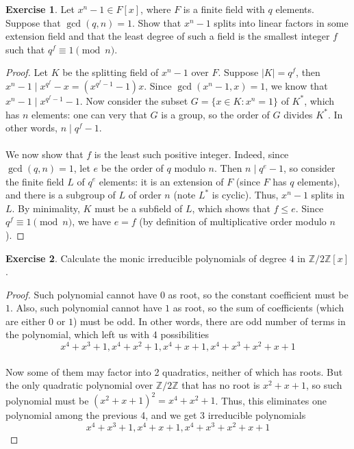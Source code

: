 \documentclass{article}
\theoremstyle{definition}
\newtheorem{exercise}{Exercise}
\begin{document}
\newpage

\begin{exercise}
Let $x^n - 1 \in F[x]$, where $F$ is a finite field with $q$ elements. Suppose that $\gcd(q, n) = 1$. Show that $x^n - 1$ splits into linear factors in some extension field and that the least degree of such a field is the smallest integer $f$ such that $q^f \equiv 1 \pmod{n}$.
\end{exercise}
\begin{proof}
Let $K$ be the splitting field of $x^n - 1$ over $F$. Suppose $|K| = q^f$, then $x^n - 1 \mid x^{q^f} - x = (x^{q^f - 1} - 1) x$. Since $\gcd(x^n - 1, x) = 1$, we know that $x^n - 1 \mid x^{q^f - 1} - 1$. Now consider the subset $G = \{ x \in K : x^n = 1 \}$ of $K^*$, which has $n$ elements: one can very that $G$ is a group, so the order of $G$ divides $K^*$. In other words, $n \mid q^f - 1$.
\\
\\
We now show that $f$ is the least such positive integer. Indeed, since $\gcd(q, n) = 1$, let $e$ be the order of $q$ modulo $n$. Then $n \mid q^e - 1$, so consider the finite field $L$ of $q^e$ elements: it is an extension of $F$ (since $F$ has $q$ elements), and there is a subgroup of $L$ of order $n$ (note $L^*$ is cyclic). Thus, $x^n - 1$ splits in $L$. By minimality, $K$ must be a subfield of $L$, which shows that $f \leq e$. Since $q^f \equiv 1 \pmod{n}$, we have $e = f$ (by definition of multiplicative order modulo $n$).
\end{proof}

\newpage

\begin{exercise}
Calculate the monic irreducible polynomials of degree $4$ in $\mathbb{Z}/2 \mathbb{Z} [x]$.
\end{exercise}
\begin{proof}
Such polynomial cannot have $0$ as root, so the constant coefficient must be $1$. Also, such polynomial cannot have $1$ as root, so the sum of coefficients (which are either $0$ or $1$) must be odd. In other words, there are odd number of terms in the polynomial, which left us with 4 possibilities
$$x^4 + x^3 + 1, x^4 + x^2 + 1, x^4 + x + 1, x^4 + x^3 + x^2 + x + 1$$
\\
Now some of them may factor into 2 quadratics, neither of which has roots. But the only quadratic polynomial over $\mathbb{Z}/2 \mathbb{Z}$ that has no root is $x^2 + x + 1$, so such polynomial must be $(x^2 + x + 1)^2 = x^4 + x^2 + 1$. Thus, this eliminates one polynomial among the previous 4, and we get 3 irreducible polynomials
$$x^4 + x^3 + 1, x^4 + x + 1, x^4 + x^3 + x^2 + x + 1$$
\end{proof}
\end{document}
